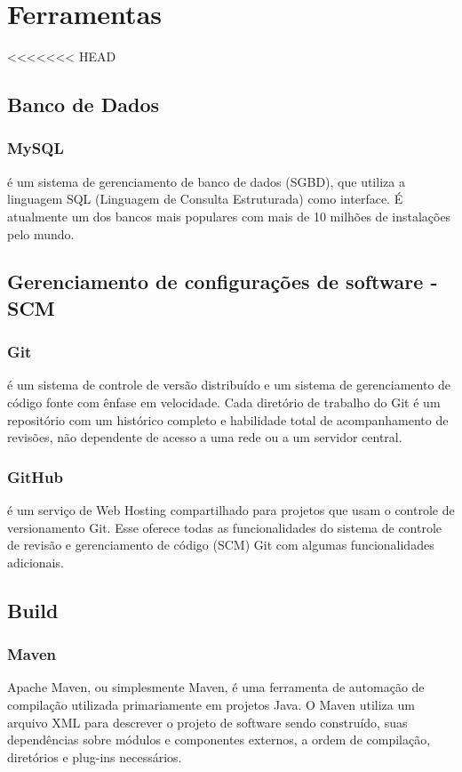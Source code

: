 \chapter{Ferramentas}

<<<<<<< HEAD
    \section{Banco de Dados}

	\subsection{MySQL} é um sistema de gerenciamento de banco de dados (SGBD), 
	que utiliza a linguagem SQL (Linguagem de Consulta Estruturada) como 
	interface. É atualmente um dos bancos mais populares com mais de 10 
	milhões de instalações pelo mundo.

    \section{Gerenciamento de configurações de software - SCM}

	\subsection{Git} é um sistema de controle de versão distribuído e um 
	sistema de gerenciamento de código fonte com ênfase em velocidade. 
	Cada diretório de trabalho do Git é um repositório com um histórico 
	completo e habilidade total de acompanhamento de revisões, não 
	dependente de acesso a uma rede ou a um servidor central.

	\subsection{GitHub} é um serviço de Web Hosting compartilhado 
	para projetos que usam o controle de versionamento Git. 
	Esse oferece todas as funcionalidades do sistema de controle de 
	revisão e gerenciamento de código (SCM) Git com algumas 
	funcionalidades adicionais.

    \section{Build}

	\subsection{Maven} Apache Maven, ou simplesmente Maven, é uma 
	ferramenta de automação de compilação utilizada primariamente 
	em projetos Java. O Maven utiliza um arquivo XML para descrever 
	o projeto de software sendo construído, suas dependências sobre 
	módulos e componentes externos, a ordem de compilação, 
	diretórios e plug-ins necessários.

